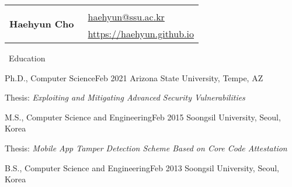 \documentclass{resume} %
\providecommand*\email[1]{\href{mailto:#1}{#1}}
\begin{document}
\begin{table}[t]
\begin{tabular}{ll}
	\multirow{3}{*}{ \Huge\textbf{Haehyun Cho} } 
	& \\
	& \hspace{1.7cm}\faEnvelopeSquare~\email{haehyun@ssu.ac.kr}\\
	& \hspace{1.7cm}\faExternalLink~\href{https://haehyun.github.io}{https://haehyun.github.io} \\
\end{tabular}
\end{table}

\vspace{-10mm}

\begin{rSection}{\faGenderless~Education}

	\begin{rSubsection}
		{Ph.D., Computer Science}{Feb 2021}
		{Arizona State University, Tempe, AZ}{}
		\item Thesis: \emph{Exploiting and Mitigating Advanced Security Vulnerabilities}
	\end{rSubsection}
	\vspace{-2mm}
	\begin{rSubsection}
		{M.S., Computer Science and Engineering}{Feb 2015}
		{Soongsil University, Seoul, Korea}{}
		\item Thesis: \emph{Mobile App Tamper Detection Scheme Based on Core Code Attestation}
		
	\end{rSubsection}
	\vspace{-2mm}
	\begin{rSubsection2}
		{B.S., Computer Science and Engineering}{Feb 2013}
		{Soongsil University, Seoul, Korea}{}
	\end{rSubsection2}

\end{rSection}
\end{document}
